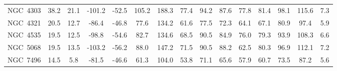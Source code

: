 \begin{table}
\begin{tabular}{ccccccccccccccc}
NGC~4303 & 38.2 & 21.1 & -101.2 & -52.5 & 105.2 & 188.3 & 77.4 & 94.2 & 87.6 & 77.8 & 81.4 & 98.1 & 115.6 & 7.3 \\
NGC~4321 & 20.5 & 12.7 & -86.4 & -46.8 & 77.6 & 134.2 & 61.6 & 77.5 & 72.3 & 64.1 & 67.1 & 80.9 & 97.4 & 5.9 \\
NGC~4535 & 19.5 & 12.5 & -98.8 & -54.6 & 82.7 & 134.6 & 68.5 & 90.5 & 84.9 & 76.0 & 79.3 & 93.9 & 108.3 & 6.6 \\
NGC~5068 & 19.5 & 13.5 & -103.2 & -56.2 & 88.0 & 147.2 & 71.5 & 90.5 & 88.2 & 62.5 & 80.3 & 96.9 & 112.1 & 7.2 \\
NGC~7496 & 14.5 & 5.8 & -81.5 & -46.6 & 61.3 & 104.0 & 53.8 & 71.1 & 65.6 & 57.9 & 60.7 & 73.5 & 87.2 & 5.6 \\
\end{tabular}
\end{table}
